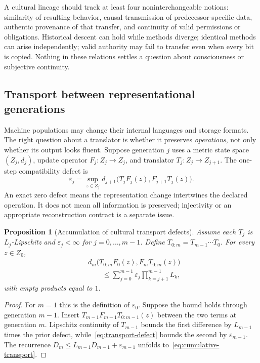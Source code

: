 \documentclass[11pt,letterpaper]{article}
\theoremstyle{plain}
\newtheorem{proposition}{Proposition}[section]
\theoremstyle{definition}
\theoremstyle{remark}
\begin{document}
A cultural lineage should track at least four noninterchangeable notions: similarity of resulting behavior, causal transmission of predecessor-specific data, authentic provenance of that transfer, and continuity of valid permissions or obligations. Historical descent can hold while methods diverge; identical methods can arise independently; valid authority may fail to transfer even when every bit is copied. Nothing in these relations settles a question about consciousness or subjective continuity.

\subsection{Transport between representational generations}

Machine populations may change their internal languages and storage formats. The right question about a translator is whether it preserves \emph{operations}, not only whether its output looks fluent. Suppose generation $j$ uses a metric state space $(Z_j,d_j)$, update operator $F_j:Z_j\to Z_j$, and translator $T_j:Z_j\to Z_{j+1}$. The one-step compatibility defect is
\begin{equation}\label{eq:transport-defect}
\varepsilon_j=\sup_{z\in Z_j}d_{j+1}\bigl(T_jF_j(z),F_{j+1}T_j(z)\bigr).
\end{equation}
An exact zero defect means the representation change intertwines the declared operation. It does not mean all information is preserved; injectivity or an appropriate reconstruction contract is a separate issue.

\begin{proposition}[Accumulation of cultural transport defects]\label{prop:transport}
Assume each $T_j$ is $L_j$-Lipschitz and $\varepsilon_j<\infty$ for $j=0,\ldots,m-1$. Define $T_{0:m}=T_{m-1}\cdots T_0$. For every $z\in Z_0$,
\begin{equation}\label{eq:cumulative-transport}
\begin{split}
&d_m\bigl(T_{0:m}F_0(z),F_mT_{0:m}(z)\bigr)\\
&\qquad\le\sum_{j=0}^{m-1}\varepsilon_j\prod_{k=j+1}^{m-1}L_k,
\end{split}
\end{equation}
with empty products equal to $1$.
\end{proposition}
\begin{proof}
For $m=1$ this is the definition of $\varepsilon_0$. Suppose the bound holds through generation $m-1$. Insert $T_{m-1}F_{m-1}T_{0:m-1}(z)$ between the two terms at generation $m$. Lipschitz continuity of $T_{m-1}$ bounds the first difference by $L_{m-1}$ times the prior defect, while~\eqref{eq:transport-defect} bounds the second by $\varepsilon_{m-1}$. The recurrence $D_m\le L_{m-1}D_{m-1}+\varepsilon_{m-1}$ unfolds to~\eqref{eq:cumulative-transport}.
\end{proof}
\end{document}

